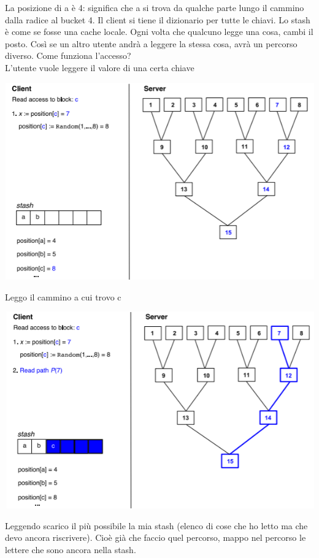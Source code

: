 La posizione di a è 4: significa che a si trova da qualche parte lungo il cammino dalla radice al bucket 4. Il client si tiene il dizionario per tutte le chiavi. Lo stash è come se fosse una cache locale. Ogni volta che qualcuno legge una cosa, cambi il posto. Così se un altro utente andrà a leggere la stessa cosa, avrà un percorso diverso. Come funziona l’accesso?\\
L'utente vuole leggere il valore di una certa chiave
\begin{center}
    \includegraphics[scale=0.8]{img/poram1.png}
\end{center}
Leggo il cammino a cui trovo c
\begin{center}
    \includegraphics[scale=0.8]{img/poram2.png}
\end{center}
Leggendo scarico il più possibile la mia stash (elenco di cose che ho letto ma che devo ancora riscrivere). Cioè già che faccio quel percorso, mappo nel percorso le lettere che sono ancora nella stash.

